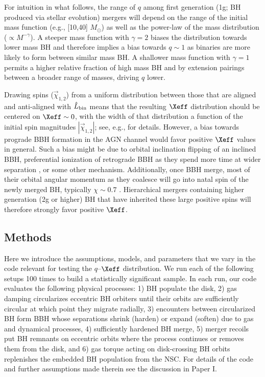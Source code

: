 For intuition in what follows, the range of $q$ among first generation (1g; BH produced via stellar evolution) mergers will depend on the range of the initial mass function (e.g., [10,40] $M_{\odot}$) as well as the power-law of the mass distribution ($\propto M^{-\gamma}$).
A steeper mass function with $\gamma = 2$ biases the distribution towards lower mass BH and therefore implies a bias towards $q \sim 1$ as binaries are more likely to form between similar mass BH.
A shallower mass function with $\gamma = 1$ permits a higher relative fraction of high mass BH and by extension pairings between a broader range of masses, driving $q$ lower.

Drawing spins ($\vec{\chi}_{1,2}$) from a uniform distribution between those that are aligned and anti-aligned with $\hat{L}_{\rm bin}$ means that the resulting $\Xeff$ distribution should be centered on $\Xeff \sim 0$, with the width of that distribution a function of the initial spin magnitudes $|\vec{\chi}_{1,2}|$; see, e.g., \cite{Callister21} for details.
However, a bias towards prograde BBH formation in the AGN channel would favor positive $\Xeff$ values in general.
Such a bias might be due to orbital inclination flipping \citep{DittmannDempseyLi24} of an inclined BBH, preferential ionization of retrograde BBH as they spend more time at wider separation \citep[on average,][]{Wang+21,Calcino+23}, or some other mechanism.
Additionally, once BBH merge, most of their orbital angular momentum as they coalesce will go into natal spin of the newly merged BH, typically $\chi \sim 0.7$ \citep{TichyMarronetti08}.
Hierarchical mergers containing higher generation (2g or higher) BH that have inherited these large positive spins will therefore strongly favor positive $\Xeff$.



\subsection{Methods}
\label{sec:methods-ch2}
Here we introduce the assumptions, models, and parameters that we vary in the  code relevant for testing the $q$--$\Xeff$ distribution.
We run each of the following setups 100 times to build a statistically significant sample.
In each run, our code evaluates the following physical processes: 1) BH populate the disk, 2) gas damping circularizes eccentric BH orbiters until their orbits are sufficiently circular at which point they migrate radially, 3) encounters between circularized BH form BBH whose separations shrink (harden) or expand (soften) due to gas and dynamical processes, 4) sufficiently hardened BH merge, 5) merger recoils put BH remnants on eccentric orbits where the process continues or removes them from the disk, and 6) gas torque acting on disk-crossing BH orbits replenishes the embedded BH population from the NSC.
For details of the code and further assumptions made therein see the discussion in Paper I.

